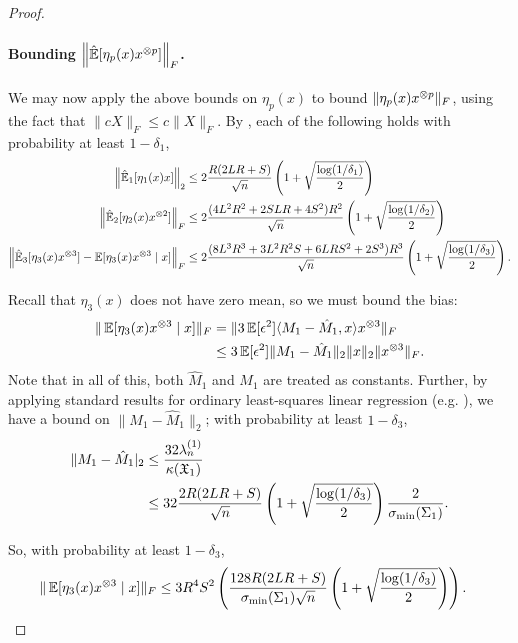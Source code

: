 \begin{proof}
\paragraph{Bounding $\left\| \hat{\operatorname{\mathbb{E}}}[\eta_p(x)x^{\otimes p}] \right\|_F$.}
We may now apply the above bounds on $\eta_p(x)$ to bound $\|\eta_p(x) x^{\otimes p}\|_F$, using the fact that $\|c X\|_F \le c\|X\|_F$.
By , each of the following holds with probability at least $1-\delta_1$,
\begin{align*}
    \left\|\hat{\operatorname{\mathbb{E}}}_1[\eta_1(x) x] \right\|_2
    &\le 2 \frac{R (2LR + S)}{\sqrt{n}} \left( 1 + \sqrt{\frac{\log(1/\delta_1)}{2}} \right) \\
  \left\|\hat{\operatorname{\mathbb{E}}}_2[\eta_2(x) x^{\otimes 2}] \right\|_F
      &\le 2 \frac{(4L^2 R^2 + 2 S L R + 4S^2)R^2}{\sqrt{n}} \left( 1 + \sqrt{\frac{\log(1/\delta_2)}{2}} \right) \\
  \left\|\hat{\operatorname{\mathbb{E}}}_3[\eta_3(x) x^{\otimes 3}] - \operatorname{\mathbb{E}}[\eta_3(x) x^{\otimes 3} \mid x] \right\|_F
      &\le 2 \frac{(8L^3 R^3 + 3 L^2 R^2 S + 6 L R S^2 + 2S^3) R^3}{\sqrt{n}} \left( 1 + \sqrt{\frac{\log(1/\delta_3)}{2}} \right).
\end{align*}

Recall that $\eta_3(x)$ does not have zero mean, so we must bound the bias:
\begin{align*}
  \| \operatorname{\mathbb{E}}[\eta_3(x) x^{\otimes 3} \mid x] \|_F &= \|3 \operatorname{\mathbb{E}}[\epsilon^2] \langle M_1 - \hat M_1, x \rangle x^{\otimes 3} \|_F \\
    &\le 3 \operatorname{\mathbb{E}}[\epsilon^2] \|M_1 - \hat M_1\|_2 \|x\|_2 \|x^{\otimes 3}\|_F.
\end{align*}
Note that in all of this, both $\hat M_1$ and $M_1$ are treated as
constants. Further, by applying standard results for ordinary least-squares linear regression (e.g. ), we have a bound on $\|M_1 - \hat
M_1\|_2$; with probability at least $1-\delta_3$,
\begin{align*}
  \| M_1 - \hat M_1 |_2
  &\le \frac{32 \lambda^{(1)}_n}{\kappa(\operatorname{\mathfrak{X}}_1)} \\
  &\le 32 \frac{2R(2LR+S)}{\sqrt{n}}\left(1 + \sqrt{\frac{\log(1/\delta_3)}{2}}\right) \frac{2}{\sigma_\text{\rm min}(\Sigma_1)}.
\end{align*}

So, with probability at least $1 - \delta_3$,
\begin{align*}
  \| \operatorname{\mathbb{E}}[\eta_3(x) x^{\otimes 3} \mid x] \|_F
  &\le 3 R^4 S^2 \left(\frac{128 R(2LR+S)}{\sigma_\text{\rm min}(\Sigma_1) \sqrt{n}} \left(1 + \sqrt{\frac{\log(1/\delta_3)}{2}} \right) \right).
\end{align*}


\end{proof}

